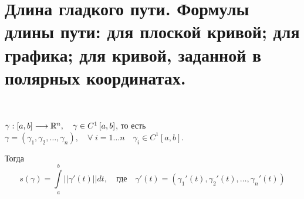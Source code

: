 \documentclass[../main.tex]{subfiles}
\begin{document}
\newpage
\section{Длина гладкого пути. Формулы длины пути: для плоской кривой; для графика; для кривой, заданной в полярных координатах.}
\begin{thm}
    
    ~

    \( \gamma : \left[ a,b\right] \longrightarrow \mathbb{R}^{n},\quad \gamma \in C^1\left[ a,b\right]\), то есть \( \gamma =\left( \gamma _1, \gamma _2, \ldots , \gamma _n\right),\quad \forall \; i=1 \ldots n\quad \gamma _i \in C^1[a,b]\).

    Тогда 
    \[ s\left( \gamma \right)= \displaystyle\int\limits_{ a}^{ b} \left| \left| \gamma '\left( t\right)\right|\right|dt,\quad \text{где}\quad \gamma '\left( t\right)=\left( \gamma _1'\left( t\right), \gamma _2'(t), \ldots , \gamma _n'\left( t\right)\right)\]
\end{thm}
\end{document}
